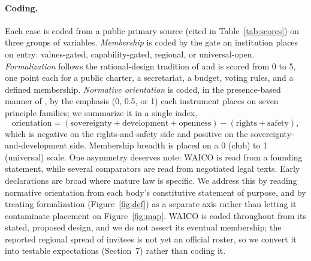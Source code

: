 \documentclass[11pt]{article}
\begin{document}
\paragraph{Coding.} Each case is coded from a public primary source (cited in Table~\ref{tab:scores}) on three groups of variables. \emph{Membership} is coded by the gate an institution places on entry: values-gated, capability-gated, regional, or universal-open. \emph{Formalization} follows the rational-design tradition of \citet{koremenos2001rational} and is scored from 0 to 5, one point each for a public charter, a secretariat, a budget, voting rules, and a defined membership. \emph{Normative orientation} is coded, in the presence-based manner of \citet{jobin2019global}, by the emphasis (0, 0.5, or 1) each instrument places on seven principle families; we summarize it in a single index,
\begin{equation}
\text{orientation} = (\text{sovereignty} + \text{development} + \text{openness}) - (\text{rights} + \text{safety}),
\end{equation}
which is negative on the rights-and-safety side and positive on the sovereignty-and-development side. Membership breadth is placed on a 0 (club) to 1 (universal) scale. One asymmetry deserves note: WAICO is read from a founding statement, while several comparators are read from negotiated legal texts. Early declarations are broad where mature law is specific. We address this by reading normative orientation from each body's constitutive statement of purpose, and by treating formalization (Figure~\ref{fig:def}) as a separate axis rather than letting it contaminate placement on Figure~\ref{fig:map}. WAICO is coded throughout from its stated, proposed design, and we do not assert its eventual membership; the reported regional spread of invitees is not yet an official roster, so we convert it into testable expectations (Section~7) rather than coding it.
\end{document}
